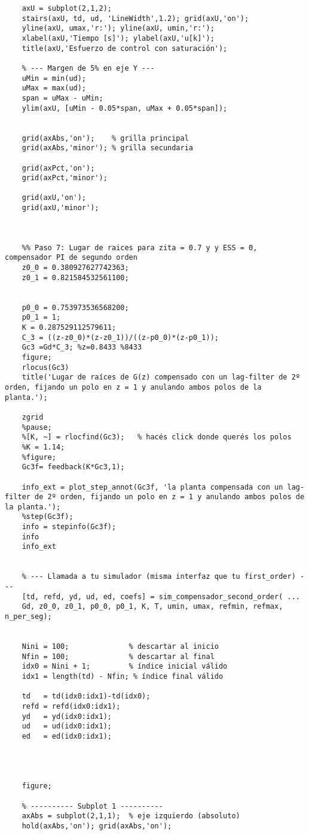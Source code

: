 \begin{lstlisting}[style=matlabstyle,caption={Segunda hoja de cálculos utilizada.},label={matlab:calculo2}]
	% ---------- Subplot 2: esfuerzo de control ----------
	axU = subplot(2,1,2);
	stairs(axU, td, ud, 'LineWidth',1.2); grid(axU,'on');
	yline(axU, umax,'r:'); yline(axU, umin,'r:');
	xlabel(axU,'Tiempo [s]'); ylabel(axU,'u[k]');
	title(axU,'Esfuerzo de control con saturación');
	
	% --- Margen de 5% en eje Y ---
	uMin = min(ud);
	uMax = max(ud);
	span = uMax - uMin;
	ylim(axU, [uMin - 0.05*span, uMax + 0.05*span]);
	
	
	grid(axAbs,'on');    % grilla principal
	grid(axAbs,'minor'); % grilla secundaria
	
	grid(axPct,'on');
	grid(axPct,'minor');
	
	grid(axU,'on');
	grid(axU,'minor');
	
	
	
	%% Paso 7: Lugar de raices para zita = 0.7 y y ESS = 0, compensador PI de segundo orden
	z0_0 = 0.380927627742363;
	z0_1 = 0.821584532561100;
	
	
	p0_0 = 0.753973536568200;
	p0_1 = 1;
	K = 0.287529112579611;
	C_3 = ((z-z0_0)*(z-z0_1))/((z-p0_0)*(z-p0_1));
	Gc3 =Gd*C_3; %z=0.8433 %8433
	figure;
	rlocus(Gc3)
	title('Lugar de raíces de G(z) compensado con un lag-filter de 2º orden, fijando un polo en z = 1 y anulando ambos polos de la planta.');
	
	zgrid
	%pause;
	%[K, ~] = rlocfind(Gc3);   % hacés click donde querés los polos
	%K = 1.14;
	%figure;
	Gc3f= feedback(K*Gc3,1);
	
	info_ext = plot_step_annot(Gc3f, 'la planta compensada con un lag-filter de 2º orden, fijando un polo en z = 1 y anulando ambos polos de la planta.');
	%step(Gc3f);
	info = stepinfo(Gc3f);
	info
	info_ext
	
	
	% --- Llamada a tu simulador (misma interfaz que tu first_order) ---
	[td, refd, yd, ud, ed, coefs] = sim_compensador_second_order( ...
	Gd, z0_0, z0_1, p0_0, p0_1, K, T, umin, umax, refmin, refmax, n_per_seg);
	
	
	Nini = 100;              % descartar al inicio
	Nfin = 100;              % descartar al final
	idx0 = Nini + 1;         % índice inicial válido
	idx1 = length(td) - Nfin; % índice final válido
	
	td   = td(idx0:idx1)-td(idx0);
	refd = refd(idx0:idx1);
	yd   = yd(idx0:idx1);
	ud   = ud(idx0:idx1);
	ed   = ed(idx0:idx1);
	
	
	
	
	figure;
	
	% ---------- Subplot 1 ----------
	axAbs = subplot(2,1,1);  % eje izquierdo (absoluto)
	hold(axAbs,'on'); grid(axAbs,'on');
	

\end{lstlisting}
